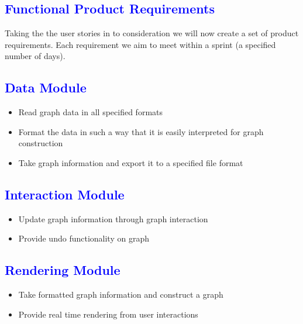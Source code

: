 \documentclass[12pt]{article}
\begin{document}
\textcolor{blue}{\section{Functional Product Requirements}}
\begin{flushleft}

	Taking the the user stories in to consideration we will now create a set of product requirements. Each requirement we aim to meet within a sprint (a specified number of days).
	
	\textcolor{blue}{\subsection{Data Module}}	
	\begin{flushleft}
	\begin{itemize}
	\item Read graph data in all specified formats
	\item Format the data in such a way that it is easily interpreted for graph construction
	\item Take graph information and export it to a specified file format
	\end{itemize}	
	\end{flushleft}
	
	\textcolor{blue}{\subsection{Interaction Module}}	
	\begin{flushleft}
	\begin{itemize}
	\item Update graph information through graph interaction
	\item Provide undo functionality on graph
	\end{itemize}	
	\end{flushleft}
	
	\textcolor{blue}{\subsection{Rendering Module}}	
	\begin{flushleft}
	\begin{itemize}
	\item Take formatted graph information and construct a graph
	\item Provide real time rendering from user interactions
	\end{itemize}	
	\end{flushleft}
	

\end{flushleft}
\end{document}
